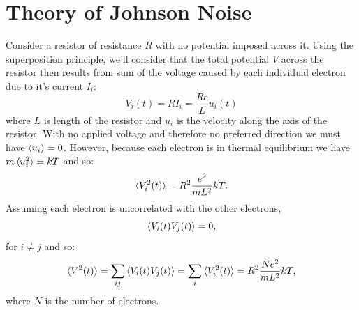\documentclass[12pt]{article}
\begin{document}
\section{Theory of Johnson Noise}

Consider a resistor of resistance $R$ with no potential imposed across it.  Using the superposition principle, we'll consider that the total potential $V$ across the resistor then results from sum of the voltage caused by each individual electron due to it's current $I_i$:
\begin{displaymath}
V_i(t) = R I_i = \frac{Re}{L} u_i(t)
\end{displaymath}
where $L$ is length of the resistor and $u_i$ is the velocity along the axis of the resistor.  With no applied voltage and therefore no preferred direction we must have $\braket{u_i}=0$.  However, because each electron is in thermal equilibrium we have $m\braket{u^2_i}=kT$ and so:
\begin{displaymath}
\braket{V^2_i(t)} = R^2 \frac{e^2}{m L^2} kT.
\end{displaymath}
Assuming each electron is uncorrelated with the other electrons,
\begin{displaymath}
\braket{V_i(t) V_j(t)} = 0,
\end{displaymath}
for $i \neq j$ and so:
\begin{displaymath}
\braket{V^2(t)} =  \sum_{ij}  \braket{ V_i(t) V_j(t) } = \sum_{i}  \braket{ V^2_i(t) } = R^2 \frac{N e^2}{m L^2} kT,
\end{displaymath}
where $N$ is the number of electrons.
\end{document}
